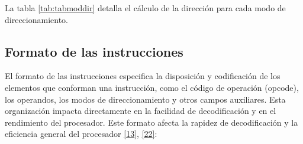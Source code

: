 \documentclass[12pt,oneside]{templates/unerthesis}
\begin{document}
La tabla \ref{tab:tabmoddir} detalla el cálculo de la dirección para cada modo de direccionamiento.

\begin{table}[!h]
\centering
\caption{\label{tab:tabmoddir}Modos de direccionamiento básicos}
\centering
{}
\end{table}

\hypertarget{formato-de-las-instrucciones}{%
\subsection{Formato de las instrucciones}\label{formato-de-las-instrucciones}}

El formato de las instrucciones especifica la disposición y codificación de los elementos que conforman una instrucción, como el código de operación (opcode), los operandos, los modos de direccionamiento y otros campos auxiliares. Esta organización impacta directamente en la facilidad de decodificación y en el rendimiento del procesador. Este formato afecta la rapidez de decodificación y la eficiencia general del procesador \protect\hyperlink{ref-hennessy2017computer}{{[}13{]}}, \protect\hyperlink{ref-tanenbaum_structured_2016}{{[}22{]}}:
\end{document}
